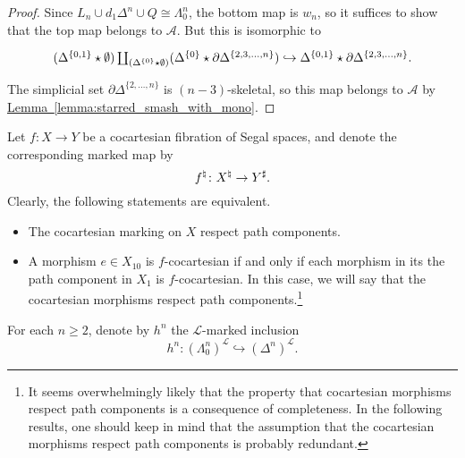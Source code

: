 \documentclass[main.tex]{subfiles}
\begin{document}
\begin{proof}
  Since $L_{n} \cup d_{1} \Delta^{n} \cup Q \cong \Lambda^{n}_{0}$, the bottom map is $w_{n}$, so it suffices to show that the top map belongs to $\mathcal{A}$. But this is isomorphic to
  \begin{equation*}
    \begin{tikzcd}
      (\Delta^{\{0, 1\}} \star \emptyset) \coprod_{(\Delta^{\{0\}} \star \emptyset)} (\Delta^{\{0\}} \star \partial \Delta^{\{2, 3, \ldots, n\}}) \hookrightarrow \Delta^{\{0, 1\}} \star \partial \Delta^{\{2, 3, \ldots, n\}}.
    \end{tikzcd}
  \end{equation*}
  The simplicial set $\partial \Delta^{\{2, \ldots, n\}}$ is $(n-3)$-skeletal, so this map belongs to $\mathcal{A}$ by \hyperref[lemma:starred_smash_with_mono]{Lemma~\ref*{lemma:starred_smash_with_mono}}.
\end{proof}

Let $f\colon X \to Y$ be a cocartesian fibration of Segal spaces, and denote the corresponding marked map by
\begin{equation*}
  f^{\natural}\colon X^{\natural} \to Y^{\sharp}.
\end{equation*}
Clearly, the following statements are equivalent.
\begin{itemize}
  \item The cocartesian marking on $X$ respect path components.

  \item A morphism $e \in X_{10}$ is $f$-cocartesian if and only if each morphism in its the path component in $X_{1}$ is $f$-cocartesian. In this case, we will say that the cocartesian morphisms respect path components.\footnote{It seems overwhelmingly likely that the property that cocartesian morphisms respect path components is a consequence of completeness. In the following results, one should keep in mind that the assumption that the cocartesian morphisms respect path components is probably redundant.}
\end{itemize}

For each $n \geq 2$, denote by $h^{n}$ the $\mathcal{L}$-marked inclusion
\begin{equation*}
  h^{n}\colon (\Lambda^{n}_{0})^{\mathcal{L}} \hookrightarrow (\Delta^{n})^{\mathcal{L}}.
\end{equation*}
\end{document}

